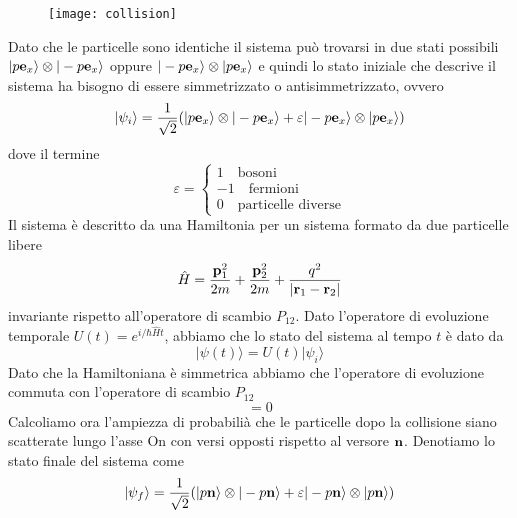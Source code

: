 \begin{figure}[!ht]
\vspace{0.1in}
\texttt{[image: collision]}	
\centering
\end{figure}

Dato che le particelle sono identiche il sistema pu\`o trovarsi in due stati possibili $|p \bold{e}_x \rangle \otimes |-p \bold{e}_x \rangle$ oppure $|-p\bold{e}_x \rangle \otimes |p\bold{e}_x \rangle $ e quindi lo stato iniziale che descrive il sistema ha bisogno di essere simmetrizzato o antisimmetrizzato, ovvero
\begin{equation*}
	|\psi_i \rangle = \frac{1}{\sqrt{2}}(|p \bold{e}_x \rangle \otimes |-p \bold{e}_x \rangle + \varepsilon |-p \bold{e}_x \rangle \otimes |p \bold{e}_x \rangle)
\end{equation*}
dove il termine 
\begin{equation*}
	\varepsilon = \left \{ \begin{array}{l}
	1 \quad \text{bosoni} \\[0.2cm]
	-1 \quad \text{fermioni} \\[0.2cm]
	0 \quad \text{particelle diverse}
	\end{array}\right.
\end{equation*}
Il sistema \`e descritto da una Hamiltonia per un sistema formato da due particelle libere 
\begin{equation*}
	\hat{H} = \frac{\bold{p}_1^2}{2m} + \frac{\bold{p}_2^2}{2m} + \frac{q^2}{|\bold{r}_1-\bold{r}_2|}
\end{equation*}
invariante rispetto all'operatore di scambio $P_{12}$. Dato l'operatore di evoluzione temporale $U(t) = e^{i/\hbar \hat{H}t}$, abbiamo che lo stato del sistema al tempo $t$ \`e dato da
\begin{equation*}
	|\psi(t) \rangle = U(t)|\psi_i \rangle
\end{equation*}
Dato che la Hamiltoniana \`e simmetrica abbiamo che l'operatore di evoluzione commuta con l'operatore di scambio $P_{12}$
\begin{equation*}
	[U,P_{12}]=0
\end{equation*}
Calcoliamo ora l'ampiezza di probabili\`a che le particelle dopo la collisione siano scatterate lungo l'asse On con versi opposti rispetto al versore $\bold{n}$. Denotiamo lo stato finale del sistema come
\begin{equation*}
	|\psi_{f} \rangle = \frac{1}{\sqrt{2}}(|p \bold{n} \rangle \otimes |-p \bold{n} \rangle + \varepsilon |-p \bold{n} \rangle \otimes |p \bold{n} \rangle)
\end{equation*}
